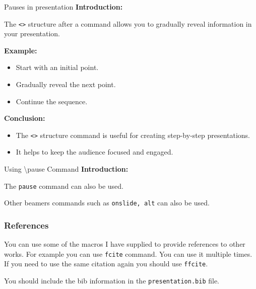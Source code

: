 \documentclass[aspectratio=169]{beamer}
\begin{document}
\begin{frame}{Pauses in presentation}
  \textbf{Introduction:}

  The \texttt{<>} structure after a command allows you to gradually reveal information in your presentation.

  \vspace{1em}

  \textbf{Example:}

  \begin{itemize}
    \item<1-> Start with an initial point.
    \item<2-> \pause Gradually reveal the next point.
    \item<3-> \pause Continue the sequence.
  \end{itemize}

  \vspace{1em}

  \textbf{Conclusion:}

  \begin{itemize}
    \item The \texttt{<>} structure command is useful for creating step-by-step presentations.
    \item It helps to keep the audience focused and engaged.
  \end{itemize}
\end{frame}



\begin{frame}{Using \textbackslash pause Command}
  \textbf{Introduction:}

  The \texttt{pause} command \pause can also be used.
  
  \vspace{3em}
  
  Other beamers commands such as \texttt{onslide, alt} can also be used.
\end{frame}

\begin{frame}
\frametitle{References}

You can use some of the macros I have supplied to provide references to other works. For example you can use \texttt{fcite} command. You can use it multiple times. If you need to use the same citation again you should use \texttt{ffcite}.

\vspace{2em}

You should include the bib information in the \texttt{presentation.bib} file.
\end{frame}
\end{document}
